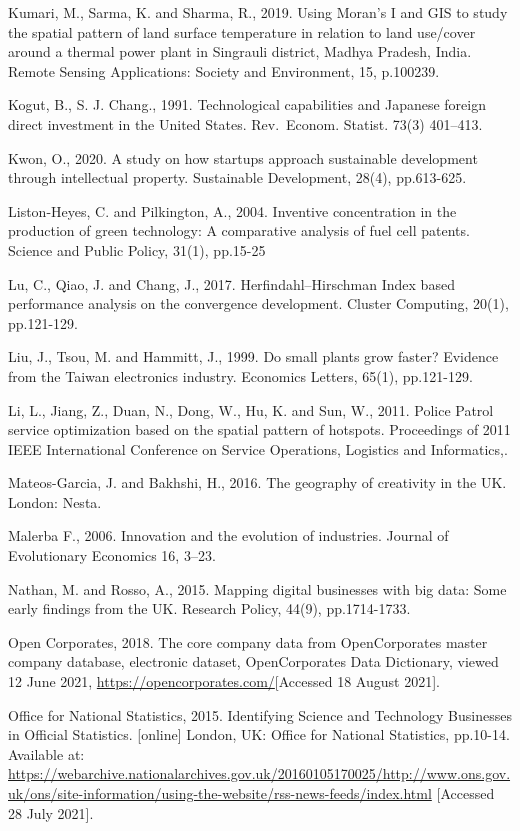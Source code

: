 \documentclass[
  12pt,
  oneside]{book}
\begin{document}
Kumari, M., Sarma, K. and Sharma, R., 2019. Using Moran's I and GIS to study the spatial pattern of land surface temperature in relation to land use/cover around a thermal power plant in Singrauli district, Madhya Pradesh, India. Remote Sensing Applications: Society and Environment, 15, p.100239.

Kogut, B., S. J. Chang., 1991. Technological capabilities and Japanese foreign direct investment in the United States. Rev.~Econom. Statist. 73(3) 401--413.

Kwon, O., 2020. A study on how startups approach sustainable development through intellectual property. Sustainable Development, 28(4), pp.613-625.

Liston-Heyes, C. and Pilkington, A., 2004. Inventive concentration in the production of green technology: A comparative analysis of fuel cell patents. Science and Public Policy, 31(1), pp.15-25

Lu, C., Qiao, J. and Chang, J., 2017. Herfindahl--Hirschman Index based performance analysis on the convergence development. Cluster Computing, 20(1), pp.121-129.

Liu, J., Tsou, M. and Hammitt, J., 1999. Do small plants grow faster? Evidence from the Taiwan electronics industry. Economics Letters, 65(1), pp.121-129.

Li, L., Jiang, Z., Duan, N., Dong, W., Hu, K. and Sun, W., 2011. Police Patrol service optimization based on the spatial pattern of hotspots. Proceedings of 2011 IEEE International Conference on Service Operations, Logistics and Informatics,.

Mateos-Garcia, J. and Bakhshi, H., 2016. The geography of creativity in the UK. London: Nesta.

Malerba F., 2006. Innovation and the evolution of industries. Journal of Evolutionary Economics 16, 3--23.

Nathan, M. and Rosso, A., 2015. Mapping digital businesses with big data: Some early findings from the UK. Research Policy, 44(9), pp.1714-1733.

Open Corporates, 2018. The core company data from OpenCorporates master company database, electronic dataset, OpenCorporates Data Dictionary, viewed 12 June 2021, \url{https://opencorporates.com/}{[}Accessed 18 August 2021{]}.

Office for National Statistics, 2015. Identifying Science and Technology Businesses in Official Statistics. {[}online{]} London, UK: Office for National Statistics, pp.10-14. Available at: \url{https://webarchive.nationalarchives.gov.uk/20160105170025/http://www.ons.gov.uk/ons/site-information/using-the-website/rss-news-feeds/index.html} {[}Accessed 28 July 2021{]}.
\end{document}

